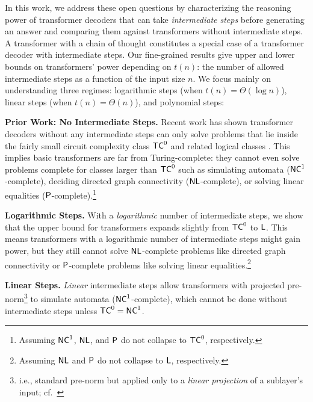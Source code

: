 \documentclass{article} %
\newcommand\changeC[1]{{\color{teal} #1}}
\renewcommand\changeC[1]{#1}
\begin{document}
In this work, we address these open questions by characterizing the reasoning power of transformer decoders that can take \emph{intermediate steps} before generating an answer and comparing them against transformers without intermediate steps. A transformer with a chain of thought constitutes a special case of a transformer decoder with intermediate steps.
Our fine-grained results give upper and lower bounds on transformers' power depending on $t(n)$: the number of allowed intermediate steps as a function of the input size $n$. We focus mainly on understanding three regimes: logarithmic steps (when $t(n) = \Theta(\log n)$), linear steps (when $t(n) = \Theta(n)$), and polynomial steps:

\begin{compactenum}
    \item \textbf{Prior Work: No Intermediate Steps.}
    Recent work has shown transformer decoders without any intermediate steps can only solve problems that lie inside the fairly small circuit complexity class $\TC^0$ \citep{merrill2023parallelism} and related logical classes \citep{merrill2023logic,chiang2023tighter}. This implies basic transformers are far from Turing-complete: they cannot even solve problems complete for classes larger than $\TC^0$ such as simulating automata ($\NC^1$-complete), deciding directed graph connectivity ($\NL$-complete), or solving linear equalities ($\P$-complete).\footnote{Assuming $\NC^1$, $\NL$, and $\P$ do not collapse to $\TC^0$, respectively.}
    \item \textbf{Logarithmic Steps.} With a \emph{logarithmic} number of intermediate steps, we show that the upper bound for transformers expands slightly from $\TC^0$ to $\L$. This means transformers with a logarithmic number of intermediate steps might gain power, but they still cannot solve $\NL$-complete problems like directed graph connectivity or $\P$-complete problems like solving linear equalities.\footnote{\label{footnote:no-collapse-to-L} Assuming $\NL$ and $\P$ do not collapse to $\L$, respectively.}
    \item \noindent \textbf{Linear Steps.}
    \emph{Linear} intermediate steps allow transformers \changeC{with projected pre-norm}\footnote{\changeC{i.e., standard pre-norm but applied only to a \emph{linear projection} of a sublayer's input; cf.~}} to simulate automata ($\NC^1$-complete),
    which cannot be done without intermediate steps unless $\TC^0 = \NC^1$.

\end{compactenum}
\end{document}
